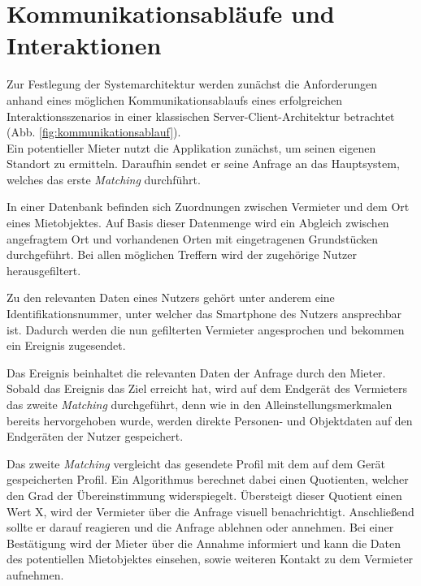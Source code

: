 
\section{Kommunikationsabläufe und Interaktionen}
Zur Festlegung der Systemarchitektur werden zunächst die Anforderungen anhand eines möglichen Kommunikationsablaufs eines erfolgreichen Interaktionsszenarios in einer klassischen Server-Client-Architektur betrachtet (Abb. \ref{fig:kommunikationsablauf}).\\

Ein potentieller Mieter nutzt die Applikation zunächst, um seinen eigenen Standort zu ermitteln. Daraufhin sendet er seine Anfrage an das Hauptsystem, welches das erste \textit{Matching} durchführt.

In einer Datenbank befinden sich Zuordnungen zwischen Vermieter und dem Ort eines Mietobjektes. Auf Basis dieser Datenmenge wird ein Abgleich zwischen angefragtem Ort und vorhandenen Orten mit eingetragenen Grundstücken durchgeführt. Bei allen möglichen Treffern wird der zugehörige Nutzer herausgefiltert.

Zu den relevanten Daten eines Nutzers gehört unter anderem eine Identifikationsnummer, unter welcher das Smartphone des Nutzers ansprechbar ist.
Dadurch werden die nun gefilterten Vermieter angesprochen und bekommen ein Ereignis zugesendet.

Das Ereignis beinhaltet die relevanten Daten der Anfrage durch den Mieter. Sobald das Ereignis das Ziel erreicht hat, wird auf dem Endgerät des Vermieters das zweite \textit{Matching} durchgeführt, denn wie in den Alleinstellungsmerkmalen bereits hervorgehoben wurde, werden direkte Personen- und Objektdaten auf den Endgeräten der Nutzer gespeichert.

Das zweite \textit{Matching} vergleicht das gesendete Profil mit dem auf dem Gerät gespeicherten Profil. Ein Algorithmus berechnet dabei einen Quotienten, welcher den Grad der Übereinstimmung widerspiegelt. Übersteigt dieser Quotient einen Wert X, wird der Vermieter über die Anfrage visuell benachrichtigt. Anschließend sollte er darauf reagieren und die Anfrage ablehnen oder annehmen. Bei einer Bestätigung wird der Mieter über die Annahme informiert und kann die Daten des potentiellen Mietobjektes einsehen, sowie weiteren Kontakt zu dem Vermieter aufnehmen.


